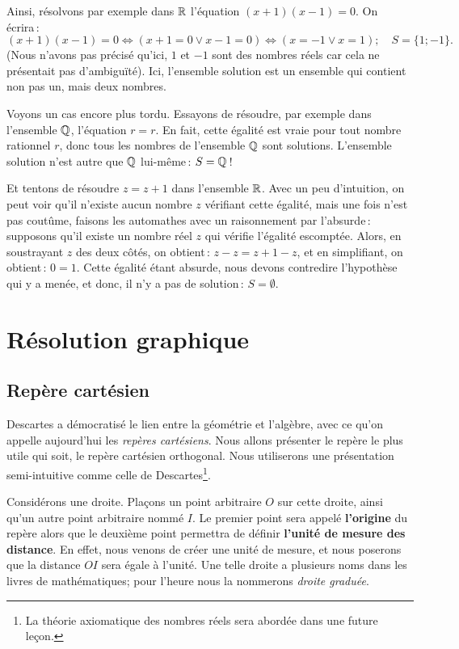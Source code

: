 		Ainsi, résolvons par exemple dans $\mathbb{R}$ l'équation $(x+1)(x-1)=0$. On écrira\,:
		\begin{equation}
			(x+1)(x-1)=0 \Leftrightarrow (x+1=0\lor x-1=0) \Leftrightarrow (x=-1\lor x=1); \quad S=\{1;-1\}.
		\end{equation}
		(Nous n'avons pas précisé qu'ici, $1$ et $-1$ sont des nombres réels car cela ne présentait pas d'ambiguïté). Ici, l'ensemble solution est un ensemble qui contient non pas un, mais deux nombres. 

		Voyons un cas encore plus tordu. Essayons de résoudre, par exemple dans l'ensemble $\mathbb{Q}$, l'équation $r=r$. En fait, cette égalité est vraie pour tout nombre rationnel $r$, donc tous les nombres de l'ensemble $\mathbb{Q}$ sont solutions. L'ensemble solution n'est autre que $\mathbb{Q}$ lui-même\,: $S=\mathbb{Q}$\,!

		Et tentons de résoudre $z=z+1$ dans l'ensemble $\mathbb{R}$. Avec un peu d'intuition, on peut voir qu'il n'existe aucun nombre $z$ vérifiant cette égalité, mais une fois n'est pas coutûme, faisons les automathes avec un raisonnement par l'absurde\,: supposons qu'il existe un nombre réel $z$ qui vérifie l'égalité escomptée. Alors, en soustrayant $z$ des deux côtés, on obtient\,: $z-z = z+1-z$, et en simplifiant, on obtient\,: $0=1$. Cette égalité étant absurde, nous devons contredire l'hypothèse qui y a menée, et donc, il n'y a pas de solution\,: $S=\emptyset$.






	\section{Résolution graphique}

		\subsection{Repère cartésien}
			Descartes a démocratisé le lien entre la géométrie et l'algèbre, avec ce qu'on appelle aujourd'hui les \emph{repères cartésiens}. Nous allons  présenter le repère le plus utile qui soit, le repère cartésien orthogonal. Nous utiliserons une présentation semi-intuitive comme celle de Descartes\footnote{La théorie axiomatique des nombres réels sera abordée dans une future leçon.}.

			Considérons une droite. Plaçons un point arbitraire $O$ sur cette droite, ainsi qu'un autre point arbitraire nommé $I$. Le premier point sera appelé {\bfseries l'origine} du repère alors que le deuxième point permettra de définir {\bfseries l'unité de mesure des distance}. En effet, nous venons de créer une unité de mesure, et nous poserons que la distance $OI$ sera égale à l'unité.
			Une telle droite a plusieurs noms dans les livres de mathématiques; pour l'heure nous la nommerons \emph{droite graduée}.

